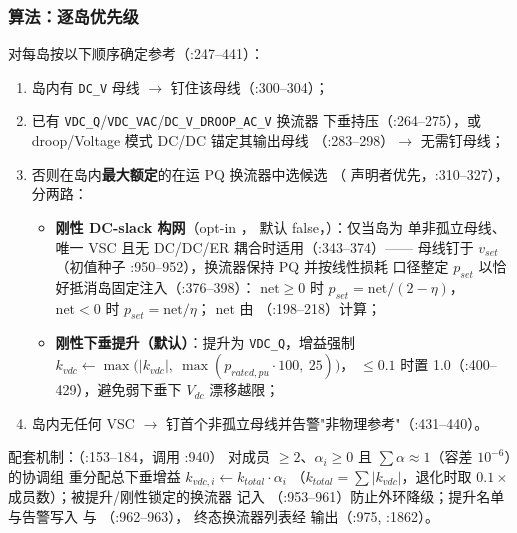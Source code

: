 \subsubsection*{算法：逐岛优先级}
对每岛按以下顺序确定参考（:247--441）：
\begin{enumerate}
  \item 岛内有 \texttt{DC\_V} 母线 $\to$ 钉住该母线（:300--304）；
  \item 已有 \texttt{VDC\_Q}/\texttt{VDC\_VAC}/\texttt{DC\_V\_DROOP\_AC\_V} 换流器
        下垂持压（:264--275），或 droop/Voltage 模式 DC/DC 锚定其输出母线
        （:283--298）$\to$ 无需钉母线；
  \item 否则在岛内\textbf{最大额定}的在运 PQ 换流器中选候选
        （ 声明者优先，:310--327），分两路：
        \begin{itemize}
          \item \textbf{刚性 DC-slack 构网}（opt-in ，
                默认 false，）：仅当岛为
                单非孤立母线、唯一 VSC 且无 DC/DC/ER 耦合时适用（:343--374）——
                母线钉于 $v_{set}$（初值种子 :950--952），换流器保持 PQ 并按线性损耗
                口径整定 $p_{set}$ 以恰好抵消岛固定注入（:376--398）：
                $\mathrm{net}\ge0$ 时 $p_{set}=\mathrm{net}/(2-\eta)$，
                $\mathrm{net}<0$ 时 $p_{set}=\mathrm{net}/\eta$；
                $\mathrm{net}$ 由 （:198--218）计算；
          \item \textbf{刚性下垂提升（默认）}：提升为 \texttt{VDC\_Q}，增益强制
                $k_{vdc}\leftarrow\max\big(|k_{vdc}|,\ \max(p_{rated,pu}\cdot100,\ 25)\big)$，
                $\le0.1$ 时置 1.0（:400--429），避免弱下垂下
                $V_{dc}$ 漂移越限；
        \end{itemize}
  \item 岛内无任何 VSC $\to$ 钉首个非孤立母线并告警"非物理参考"（:431--440）。
\end{enumerate}
配套机制：（:153--184，调用 :940）
对成员 $\ge2$、$\alpha_i\ge0$ 且 $\sum\alpha\approx1$（容差 $10^{-6}$）的协调组
重分配总下垂增益 $k_{vdc,i}\leftarrow k_{total}\cdot\alpha_i$
（$k_{total}=\sum|k_{vdc}|$，退化时取 $0.1\times$ 成员数）；被提升/刚性锁定的换流器
记入 （:953--961）防止外环降级；提升名单与告警写入
 与 （:962--963），
终态换流器列表经  输出（:975, :1862）。

